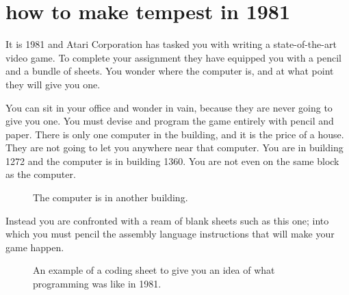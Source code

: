 \chapter{how to make tempest in 1981}
\label{sec:building}
\lstset{style=6502Style}
\lhead[tempest]{}

It is 1981 and Atari Corporation has tasked you with writing a state-of-the-art video game.
To complete your assignment they have equipped you with a pencil and a bundle of sheets. You
wonder where the computer is, and at what point they will give you one. 

You can sit in your office and wonder in vain, because they are never going to give you one.
You must devise and program the game entirely with pencil and paper. There is only one computer
in the building, and it is the price of a house. They are not going to let
you anywhere near that computer. You are in building 1272 and the computer is in building 1360.
You are not even on the same block as the computer.
\begin{figure}[H]
			\centering
		\caption{The computer is in another building.}
\end{figure}

Instead you are confronted with a ream of blank sheets such as this one; into which you must pencil
the assembly language instructions that will make your game happen.
\begin{figure}[H]
			\centering
		\caption{An example of a coding sheet to give you an idea of what programming was like in 1981.}
\end{figure}

